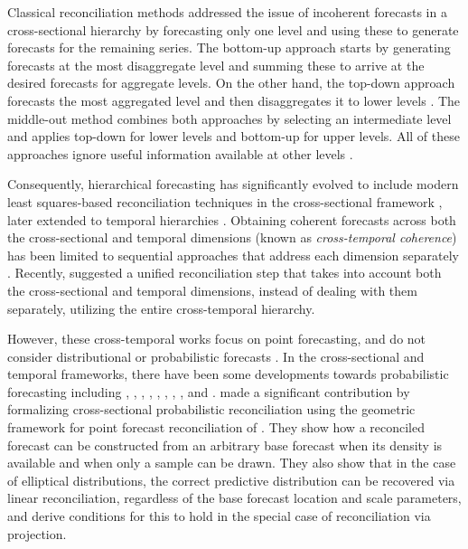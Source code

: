 \documentclass[12pt]{article}
\theoremstyle{definition}
\begin{document}
Classical reconciliation methods addressed the issue of incoherent forecasts in a cross-sectional hierarchy by forecasting only one level and using these to generate forecasts for the remaining series. The bottom-up approach \citep{dunn1976} starts by generating forecasts at the most disaggregate level and summing these to arrive at the desired forecasts for aggregate levels. On the other hand, the top-down approach \citep{gross1990} forecasts the most aggregated level and then disaggregates it to lower levels \citep{fliedner2001, athanasopoulos2009}. The middle-out method \citep{athanasopoulos2009} combines both approaches by selecting an intermediate level and applies top-down for lower levels and bottom-up for upper levels.
All of these approaches ignore useful information available at other levels \citep{pennings2017}. 

Consequently, hierarchical forecasting has significantly evolved to include modern least squares-based reconciliation techniques in the cross-sectional framework \citep{hyndman2011, wickramasuriya2019, panagiotelis2021}, later extended to temporal hierarchies \citep{athanasopoulos2017, nystrup2020}. 
Obtaining coherent forecasts across both the cross-sectional and temporal dimensions (known as \textit{cross-temporal coherence}) has been limited to sequential approaches that address each dimension separately \citep{kourentzes2019, yagli2019, punia2020, spiliotis2020}. Recently, \citet{difonzo2023} suggested a unified reconciliation step that takes into account both the cross-sectional and temporal dimensions, instead of dealing with them separately, utilizing the entire cross-temporal hierarchy.


However, these cross-temporal works focus on point forecasting, and do not consider distributional or probabilistic forecasts \citep{gneiting2014}. In the cross-sectional and temporal frameworks, there have been some developments towards probabilistic forecasting including  \cite{bentaieb2017}, \cite{panamtash2018}, \cite{jeon2019}, \cite{yang2020}, \cite{yagli2020}, 
\cite{bentaieb2021}, \cite{corani2021}, \cite{corani2022}, \cite{zambon2022} and \cite{wickramasuriya2021b}. \cite{panagiotelis2023} made a significant contribution by formalizing cross-sectional probabilistic reconciliation using the geometric framework for point forecast reconciliation of \cite{panagiotelis2021}. They show how a reconciled forecast can be constructed from an arbitrary base forecast when its density is available and when only a sample can be drawn. They also show that in the case of elliptical distributions, the correct predictive distribution can be recovered via linear reconciliation, regardless of the base forecast location and scale parameters, and derive conditions for this to hold in the special case of reconciliation via projection. 
\end{document}
